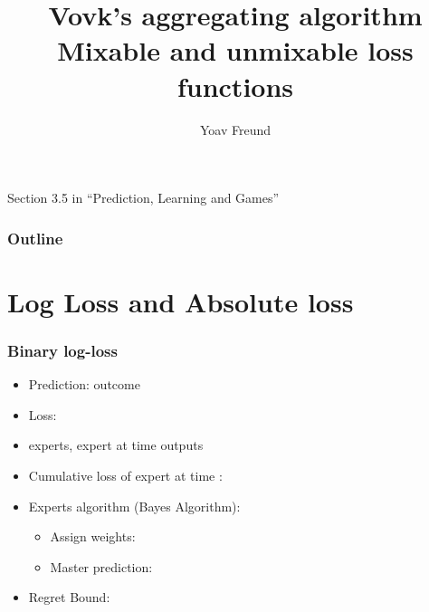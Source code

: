 \documentclass{beamer}
\title [Vovk's algorithm] %
{Vovk's aggregating algorithm \\ Mixable and unmixable loss functions}
\author[Freund] %
{Yoav Freund}
\institute[Universities of Somewhere and Elsewhere] %
\begin{document}
%

\begin{frame}
  \titlepage

Section 3.5 in ``Prediction, Learning and Games''
\end{frame}

\begin{frame}
  \frametitle{Outline}
  \tableofcontents[pausesections]
\end{frame}

\section{Log Loss and Absolute loss}

\begin{frame}
\frametitle{Binary log-loss}
\begin{itemize}
\item Prediction:  outcome 
\item Loss: 
\item {} experts, expert  at time  outputs 
\item Cumulative loss of expert  at time : 
\item Experts algorithm (Bayes Algorithm):
  \begin{itemize}
    \item Assign weights: 
    \item Master prediction:
  \end{itemize}
\item Regret Bound:
\end{itemize}
\end{frame}
\end{document}
